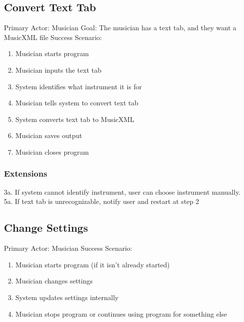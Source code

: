 \documentclass[11pt]{article}
\begin{document}
\subsection{Convert Text Tab}
\label{sec:orge50ba8c}
Primary Actor: Musician
Goal: The musician has a text tab, and they want a MusicXML file
Success Scenario:
\begin{enumerate}
\item Musician starts program
\item Musician inputs the text tab
\item System identifies what instrument it is for
\item Musician tells system to convert text tab
\item System converts text tab to MusicXML
\item Musician saves output
\item Musician closes program
\end{enumerate}

\subsubsection{Extensions}
\label{sec:org9af5b87}
3a. If system cannot identify instrument, user can choose instrument manually.
5a. If text tab is unrecognizable, notify user and restart at step 2

\subsection{Change Settings}
\label{sec:orgc2d28b8}
Primary Actor: Musician
Success Scenario:
\begin{enumerate}
\item Musician starts program (if it isn't already started)
\item Musician changes settings
\item System updates settings internally
\item Musician stops program or continues using program for something else
\end{enumerate}
\end{document}
